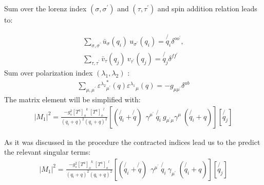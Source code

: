 Sum over the lorenz index $({\sigma},{\sigma}^{\prime})$ and $({\tau},{\tau}^{\prime})$ and spin addition relation leads to:
 
\begin{equation}
\begin{split}
\displaystyle\sum\limits_{{\sigma},{\sigma}^{\prime}} {\bar{u}}_{\sigma}(q_i)\:u_{{\sigma}^{\prime}}(q_i) = \not{q_i} \delta^{{o}{o}^{\prime}},\\
\displaystyle\sum\limits_{{\tau},{\tau}^{\prime}} {\bar{v}}_{\tau}(q_j)\:v_{{\tau}^{\prime}}(q_j) = \not{q_j} \delta^{{f}{f}^{\prime}}
\end{split}
\end{equation}
Sum over polarization index $({\lambda_{1}},{\lambda}_{2})$ :
\begin{equation}
\begin{split}
 \displaystyle\sum\limits_{{\mu},{\mu}^{\prime}} {{\varepsilon^{\lambda_2}}_{{\mu}^{\prime}}^* (q) {\varepsilon^{\lambda_1}}_{\mu} (q)} = -g_{{\mu}{\mu}^{\prime}} \delta^{{a}{b}}
\end{split}
\end{equation}
The matrix element will be simplified with: 
\begin{equation}
\begin{split}
|M_1|^2=\frac{-g_s^2  {[T^a]_{o}}^k \: {[T^a]_o}^l }{(q_i + q)^2 (q_i + q)^2}
[(\not{q_i} + \not{q}) \:
 \:  \gamma^{{\mu}^{\prime}} \: \not{q_i} \: g_{{{\mu}^{\prime}}{\mu}} 
\gamma^{\mu} \: (\not{q_i} + q)]
[\not{q_j}]
\end{split}
\end{equation}

As it was discussed in the procedure the contracted indices lead us to the predict the relevant singular terms:
\begin{equation}
\begin{split}
|M_1|^2=\frac{-g_s^2  {[T^a]_{o}}^k \: {[T^a]_o}^l }{(q_i + q)^2 (q_i + q)^2}
[(\not{q_i} + \not{q}) \:
 \:  \gamma^{{\mu}^{\prime}} \: \not{q_i} \: 
\gamma_{{\mu}^{\prime}} \: (\not{q_i} + q)]
[\not{q_j}]
\label{first}
\end{split}
\end{equation}

